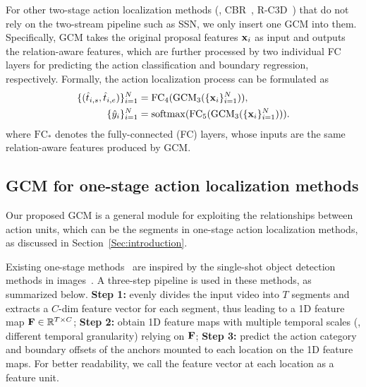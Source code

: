 \documentclass[10pt,journal,compsoc]{IEEEtran}
\begin{document}
	For other two-stage action localization methods (\eg, CBR~\cite{gao2017cascaded}, R-C3D~\cite{xu2017r}) that do not rely on the two-stream pipeline such as SSN, we only insert one GCM into them. 
	Specifically, GCM takes the original proposal features ${\bf x}_i$ as input and outputs the relation-aware features, which are further processed by two individual FC layers for predicting the action classification and boundary regression, respectively. Formally, the action localization process can be formulated as 
	\begin{eqnarray}
	\begin{aligned}
	\label{Eq:GCM2}
	\{(\hat{t}_{i,s}, \hat{t}_{i,e})\}_{i=1}^{N}& = \mathrm{FC}_4(\mathrm{GCM}_3(\{{\bf x}_i\}_{i=1}^N)),\\
	\{\hat{y}_i\}_{i=1}^{N} &=  \mathrm{softmax}(\mathrm{FC}_5(\mathrm{GCM}_3(\{{\bf x}_i\}_{i=1}^N))).
	\end{aligned}
	\end{eqnarray}
	where $\mathrm{FC}_*$ denotes the fully-connected (FC) layers, whose inputs are the same relation-aware features produced by GCM.
	
	
	
	
	\subsection{GCM for one-stage action localization methods}\label{Sec:one-stage}
	Our proposed GCM is a general module for exploiting the relationships between action units, which can be the segments in one-stage action localization methods, as discussed in Section~\ref{Sec:introduction}.
	
	Existing one-stage methods~\cite{huang2019decoupling,lin2017single} are inspired by the single-shot object detection methods in images~\cite{liu2016ssd}. A three-step pipeline is used in these methods, as summarized below.
	\textbf{Step 1:} evenly divides the input video into $T$ segments and extracts a $C$-dim feature vector for each segment, thus leading to a 1D feature map ${\bf F}\in\mathbb{R}^{T \times C}$; \textbf{Step 2:} obtain 1D feature maps with multiple temporal scales (\ie, different temporal granularity) relying on ${\bf F}$; \textbf{Step 3:} predict the action category and boundary offsets of the anchors mounted to each location on the 1D feature maps. For better readability, we call the feature vector at each location as a feature unit.
	
\end{document}
